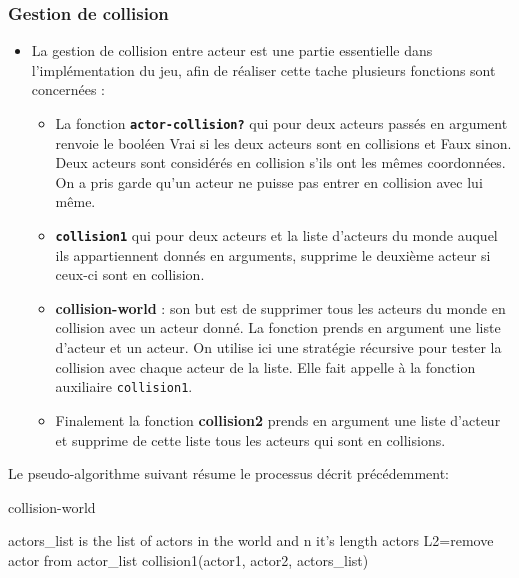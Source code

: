\documentclass[a4paper,10pt]{article}
\begin{document}
\subsubsection{Gestion de collision}
\begin{itemize}
\item La gestion de collision entre acteur est une partie essentielle dans l'implémentation du jeu, afin de réaliser cette tache  plusieurs fonctions sont concernées : \\
\begin{itemize}
    \item La fonction \textbf{\texttt{actor-collision?}} qui pour deux acteurs passés en argument renvoie le booléen Vrai si les deux acteurs sont en collisions et Faux sinon. Deux acteurs sont considérés en collision s'ils ont les mêmes coordonnées. On a pris garde qu'un acteur ne puisse pas entrer en collision avec lui  même. \\
    \item \textbf{\texttt{collision1}} qui pour deux acteurs  et la liste d'acteurs du monde auquel ils appartiennent donnés en arguments, supprime le deuxième acteur si ceux-ci sont en collision.\\
    \item \textbf{collision-world} : son but est de supprimer tous les acteurs du monde en collision avec un acteur donné. La fonction prends en argument une liste d'acteur et un acteur. On utilise ici une stratégie récursive pour tester la collision avec chaque acteur de la liste. Elle fait appelle à la fonction auxiliaire \texttt{collision1}.
    \item Finalement la fonction \textbf{collision2} prends en argument une liste d'acteur et supprime de cette liste tous les acteurs qui sont en collisions.\\
\end{itemize}
\end{itemize}
Le pseudo-algorithme suivant résume le processus décrit précédemment:\\   
\begin{algorithm}
\caption{collision-world}
\begin{algorithmic}
\STATE actors\_list is the list of actors in the world and n it's length 
\RETURN actors
\ENDIF
{}
    \STATE L2=remove actor from actor\_list
        \STATE collision1(actor1, actor2, actors\_list)
    \ENDFOR
\ENDFOR
\end{algorithmic}
\end{algorithm}
\end{document}
